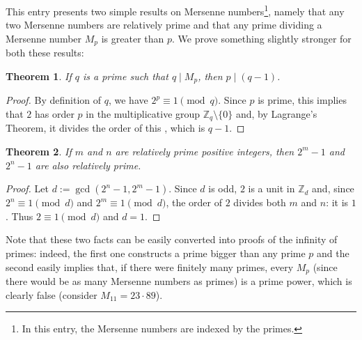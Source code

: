 \documentclass[12pt]{article}
\newtheorem*{thm}{Theorem}
\newcommand{\bbZ}{\mathbb{Z}}
\renewcommand{\div}{\!\mid\!}
\begin{document}
This entry presents two simple results on Mersenne numbers\footnote{In this entry, the Mersenne numbers are indexed by the primes.}, namely that any two Mersenne numbers are relatively prime and that any prime dividing a Mersenne number \(M_p\) is greater than \(p\). We prove something slightly stronger for both these results:
\begin{thm} If \(q\) is a prime such that \(q\div M_p\), then \(p \div (q-1)\). \end{thm}
\begin{proof}
By definition of \(q\), we have \(2^p \equiv 1 \pmod q\). Since \(p\) is prime, this implies that \(2\) has order \(p\) in the multiplicative group \(\bbZ_q\mathbin{\setminus}\{0\}\) and, by Lagrange's Theorem, it divides the order of this , which is \(q-1\).
\end{proof}
\begin{thm} If \(m\) and \(n\) are relatively prime positive integers, then \(2^m-1\) and \(2^n-1\) are also relatively prime. \end{thm}
\begin{proof}
Let \(d := \gcd(2^n-1,2^m-1)\). Since \(d\) is odd, \(2\) is a unit in \(\bbZ_d\) and, since \(2^n \equiv 1 \pmod d\) and \(2^m \equiv 1 \pmod d\), the order of \(2\) divides both \(m\) and \(n\): it is \(1\). Thus \(2 \equiv 1 \pmod d\) and \(d=1\).
\end{proof}
Note that these two facts can be easily converted into proofs of the infinity of primes: indeed, the first one constructs a prime bigger than any prime \(p\) and the second easily implies that, if there were finitely many primes, every \(M_p\) (since there would be as many Mersenne numbers as primes) is a prime power, which is clearly false (consider \(M_{11} = 23\cdot89\)).
\end{document}
